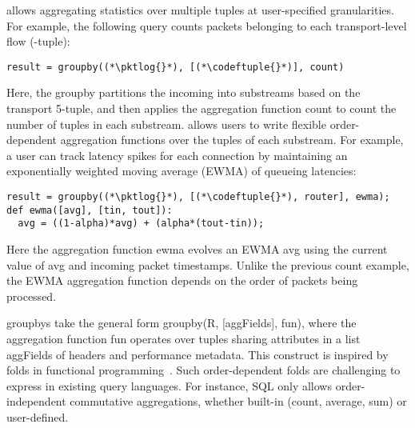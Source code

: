  \TheSystem allows
aggregating statistics over multiple tuples at user-specified
granularities. For example, the following query counts packets belonging to
each transport-level flow (-tuple):
\begin{lstlisting}
result = groupby((*\pktlog{}*), [(*\codeftuple{}*)], count)
\end{lstlisting}
Here, the {\ct groupby} partitions the incoming {\ct \pktlog} into substreams
based on the transport 5-tuple, and then applies the aggregation function {\ct
count} to count the number of tuples in each substream.  \TheSystem allows users to write
flexible order-dependent aggregation functions over the tuples of each substream. For example,
a user can track latency spikes for each connection by maintaining an
exponentially weighted moving average (EWMA) of queueing latencies:
\begin{lstlisting}
result = groupby((*\pktlog{}*), [(*\codeftuple{}*), router], ewma);
def ewma([avg], [tin, tout]):
  avg = ((1-alpha)*avg) + (alpha*(tout-tin));
\end{lstlisting}
Here the aggregation function {\ct ewma} evolves an EWMA {\ct avg} using the
current value of {\ct avg} and incoming packet timestamps. Unlike the previous
{\ct count} example, the EWMA aggregation function depends on the order of
packets being processed.%

{\ct groupby}s take the general form {\ct groupby(R, [aggFields], fun)}, where
the aggregation function {\ct fun} operates over tuples sharing attributes in a
list {\ct aggFields} of headers and performance metadata. This construct is
inspired by folds in functional
programming~\cite{comprehensive-comprehensions}.  Such order-dependent folds
are challenging to express in existing query languages. For instance, SQL only
allows order-independent commutative aggregations, whether built-in (\eg count,
average, sum) or user-defined.

